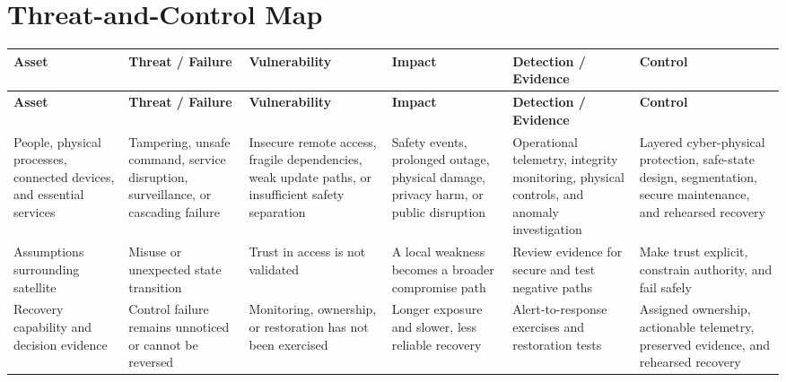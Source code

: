 \documentclass[11pt,letterpaper]{article}
\begin{document}
\section*{Threat-and-Control Map}
\begingroup\scriptsize\setlength{\tabcolsep}{2pt}
\begin{longtable}{>{\raggedright\arraybackslash}p{}>{\raggedright\arraybackslash}p{}>{\raggedright\arraybackslash}p{}>{\raggedright\arraybackslash}p{}>{\raggedright\arraybackslash}p{}>{\raggedright\arraybackslash}p{}}
\toprule\rowcolor{Navy}\color{white}\textbf{Asset} & \color{white}\textbf{Threat / Failure} & \color{white}\textbf{Vulnerability} & \color{white}\textbf{Impact} & \color{white}\textbf{Detection / Evidence} & \color{white}\textbf{Control}\\\midrule
\endfirsthead
\toprule\rowcolor{Navy}\color{white}\textbf{Asset} & \color{white}\textbf{Threat / Failure} & \color{white}\textbf{Vulnerability} & \color{white}\textbf{Impact} & \color{white}\textbf{Detection / Evidence} & \color{white}\textbf{Control}\\\midrule
\endhead
People, physical processes, connected devices, and essential services & Tampering, unsafe command, service disruption, surveillance, or cascading failure & Insecure remote access, fragile dependencies, weak update paths, or insufficient safety separation & Safety events, prolonged outage, physical damage, privacy harm, or public disruption & Operational telemetry, integrity monitoring, physical controls, and anomaly investigation & Layered cyber-physical protection, safe-state design, segmentation, secure maintenance, and rehearsed recovery\\\midrule
Assumptions surrounding satellite & Misuse or unexpected state transition & Trust in access is not validated & A local weakness becomes a broader compromise path & Review evidence for secure and test negative paths & Make trust explicit, constrain authority, and fail safely\\\midrule
Recovery capability and decision evidence & Control failure remains unnoticed or cannot be reversed & Monitoring, ownership, or restoration has not been exercised & Longer exposure and slower, less reliable recovery & Alert-to-response exercises and restoration tests & Assigned ownership, actionable telemetry, preserved evidence, and rehearsed recovery\\\midrule
\bottomrule
\end{longtable}
\endgroup
\end{document}
